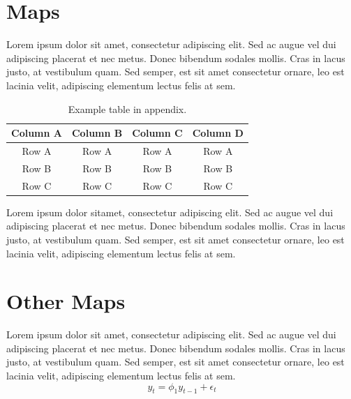 
\chapter{Maps}

Lorem ipsum dolor sit amet, consectetur adipiscing elit. Sed ac augue vel dui 
adipiscing placerat et nec metus. Donec bibendum sodales mollis. Cras in lacus 
justo, at vestibulum quam. Sed semper, est sit amet consectetur ornare, leo est 
lacinia velit, adipiscing elementum lectus felis at sem.

\vspace{3pt}
\begin{table}[!ht]
\centering
\setlength{\tabcolsep}{14pt}
\caption{Example table in appendix.}
\begin{tabular}{cccc}
\toprule\midrule
Column A & Column B & Column C & Column D \\
\hline
Row A & Row A & Row A & Row A \\
Row B & Row B & Row B & Row B \\
Row C & Row C & Row C & Row C \\
\bottomrule
\end{tabular}
\label{table:appendix}
\end{table}

Lorem ipsum dolor sitamet, consectetur adipiscing elit. Sed ac augue vel dui 
adipiscing placerat et nec metus. Donec bibendum sodales mollis. Cras in lacus 
justo, at vestibulum quam. Sed semper, est sit amet consectetur ornare, leo est 
lacinia velit, adipiscing elementum lectus felis at sem.

\chapter{Other Maps}

Lorem ipsum dolor sit amet, consectetur adipiscing elit. Sed ac augue vel dui 
adipiscing placerat et nec metus. Donec bibendum sodales mollis. Cras in lacus 
justo, at vestibulum quam. Sed semper, est sit amet consectetur ornare, leo est 
lacinia velit, adipiscing elementum lectus felis at sem.
%
\begin{equation}
    y_{t} = \phi_{1} y_{t-1} + \epsilon_{t}
\label{eq:appendix}
\end{equation}

